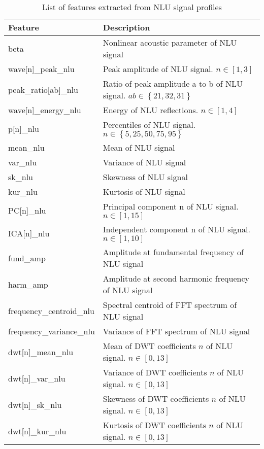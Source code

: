 \begin{table}
    \centering
    \caption{List of features extracted from NLU signal profiles}
    \label{table: nlu feature}
    \begin{tabularx}{\textwidth}{
      >{\arraybackslash\hsize=0.5\hsize}X
      >{\arraybackslash}X
    }
      \toprule
      Feature & Description \\
      \midrule
      beta & Nonlinear acoustic parameter of NLU signal \\
      wave[n]\_peak\_nlu & Peak amplitude of NLU signal. $n \in \left[ 1, 3 \right] $ \\
      peak\_ratio[ab]\_nlu & Ratio of peak amplitude a to b of NLU signal. $ab \in \left\{ 21, 32, 31 \right\} $ \\
      wave[n]\_energy\_nlu & Energy of NLU reflections. $n \in \left[ 1, 4 \right] $ \\
      p[n]\_nlu & Percentiles of NLU signal. $n \in \left\{5, 25, 50, 75, 95 \right\}$ \\
      mean\_nlu & Mean of NLU signal \\
      var\_nlu & Variance of NLU signal \\
      sk\_nlu & Skewness of NLU signal \\
      kur\_nlu & Kurtosis of NLU signal \\
      PC[n]\_nlu & Principal component n of NLU signal. $n \in \left[ 1, 15 \right]$ \\
      ICA[n]\_nlu & Independent component n of NLU signal. $n \in \left[ 1, 10 \right]$ \\
      fund\_amp & Amplitude at fundamental frequency of NLU signal \\
      harm\_amp & Amplitude at second harmonic frequency of NLU signal \\
      frequency\_centroid\_nlu & Spectral centroid of FFT spectrum of NLU signal \\
      frequency\_variance\_nlu & Variance of FFT spectrum of NLU signal \\
      dwt[n]\_mean\_nlu & Mean of DWT coefficients $n$ of NLU signal. $n \in \left[ 0, 13 \right] $ \\
      dwt[n]\_var\_nlu & Variance of DWT coefficients $n$ of NLU signal. $n \in \left[ 0, 13 \right] $ \\
      dwt[n]\_sk\_nlu & Skewness of DWT coefficients $n$ of NLU signal. $n \in \left[ 0, 13 \right] $ \\
      dwt[n]\_kur\_nlu & Kurtosis of DWT coefficients $n$ of NLU signal. $n \in \left[ 0, 13 \right] $ \\
      \bottomrule
    \end{tabularx}
\end{table}